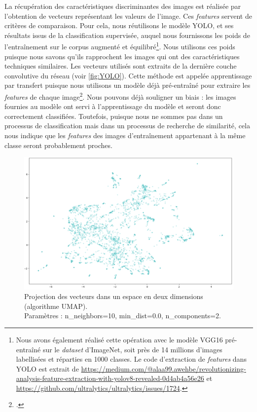 La récupération des caractéristiques discriminantes des images est réalisée par l'obtention de vecteurs représentant les valeurs de l'image. Ces \textit{features} servent de critères de comparaison. Pour cela, nous réutilisons le modèle YOLO, et ses résultats issus de la classification supervisée, auquel nous fournissons les poids de l'entraînement sur le corpus augmenté et équilibré\footnote{Nous avons également réalisé cette opération avec le modèle VGG16 pré-entraîné sur le \textit{dataset} d'ImageNet, soit près de 14 millions d'images labellisées et réparties en 1000 classes. Le code d'extraction de \textit{features} dans YOLO est extrait de \url{https://medium.com/@alaa99.awehbe/revolutionizing-analysis-feature-extraction-with-yolov8-revealed-0d4ab4a56e26} et \url{https://github.com/ultralytics/ultralytics/issues/1724}.}. Nous utilisons ces poids puisque nous savons qu'ils rapprochent les images qui ont des caractéristiques techniques similaires. Les vecteurs utilisés sont extraits de la dernière couche convolutive du réseau (voir \ref{fig:YOLO}). Cette méthode est appelée apprentissage par transfert puisque nous utilisons un modèle déjà pré-entraîné pour extraire les \textit{features} de chaque image\footcite[p.~3]{hosnaTransferLearningFriendly2022}.
Nous pouvons déjà souligner un biais : les images fournies au modèle ont servi à l'apprentissage du modèle et seront donc correctement classifiées. Toutefois, puisque nous ne sommes pas dans un processus de classification mais dans un processus de recherche de similarité,  cela nous indique que les \textit{features} des images d'entraînement appartenant à la même classe seront probablement proches. \\

\begin{figure}[!h]
	\begin{center}
		\includegraphics[width=16cm]{../images/YOLO_NS_UMAP.png}
		\caption{Projection des vecteurs dans un espace en deux dimensions (algorithme UMAP). \\ Paramètres : n\_neighbors=10, min\_dist=0.0,  n\_components=2.}
	 \end{center}
\end{figure}

